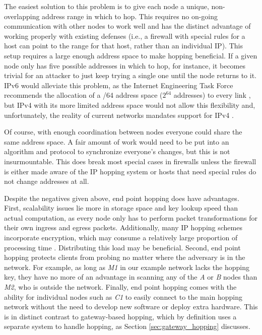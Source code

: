 \par The easiest solution to this problem is to give each node a unique, non-overlapping address range in which to hop. This requires no on-going communication with other nodes to work well and has the distinct advantage of working properly with existing defenses (i.e., a firewall with special rules for a host can point to the range for that host, rather than an individual IP). This setup requires a large enough address space to make hopping beneficial. If a given node only has five possible addresses in which to hop, for instance, it becomes trivial for an attacker to just keep trying a single one until the node returns to it. \ac{IPv6} would alleviate this problem, as the Internet Engineering Task Force recommends the allocation of a /64 address space ($2^{64}$ addresses) to every link \cite{rfc3267}, but \ac{IPv4} with its more limited address space would not allow this flexibility and, unfortunately, the reality of current networks mandates support for \ac{IPv4} \cite{EvaluatingIPv6}. 

\par Of course, with enough coordination between nodes everyone could share the same address space. A fair amount of work would need to be put into an algorithm and protocol to synchronize everyone's changes, but this is not insurmountable. This does break most special cases in firewalls unless the firewall is either made aware of the \ac{IP} hopping system or hosts that need special rules do not change addresses at all.

\par Despite the negatives given above, end point hopping does have advantages. First, scalability issues lie more in storage space and key lookup speed than actual computation, as every node only has to perform packet transformations for their own ingress and egress packets. Additionally, many \ac{IP} hopping schemes incorporate encryption, which may consume a relatively large proportion of processing time \cite{BBNDYNAT, SandiaDynat}. Distributing this load may be beneficial. Second, end point hopping protects clients from probing no matter where the adversary is in the network. For example, as long as \textit{M1} in our example network lacks the hopping key, they have no more of an advantage in scanning any of the \textit{A} or \textit{B} nodes than \textit{M2}, who is outside the network. Finally, end point hopping comes with the ability for individual nodes such as \textit{C1} to easily connect to the main hopping network without the need to develop new software or deploy extra hardware. This is in distinct contrast to gateway-based hopping, which by definition uses a separate system to handle hopping, as Section \ref{sec:gateway_hopping} discusses.

